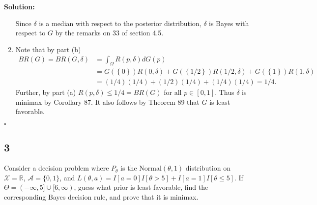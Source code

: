 \documentclass[12pt]{article}
\newcounter{ProofCounter}
\newenvironment{Solution}{\stepcounter{ProofCounter}\textbf{Solution:}}{\hfill$\square$}
\begin{document}
\begin{Solution}
\begin{enumerate}[label=(\alph*), leftmargin=*]
      Since $\delta$ is a median with respect to the posterior distribution, $\delta$ is Bayes with respect to $G$ by the remarks on 33 of section
      4.5.


    \item Note that by part (b)
      \begin{align*}
        BR(G) = BR(G, \delta)& = \int_{\Omega}R(p, \delta)dG(p) \\
        & = G(\left\{ 0 \right\}) R(0,\delta) + G(\left\{ 1/2 \right\})R(1/2, \delta) + G(\left\{ 1 \right\})R(1,\delta) \\
        & = (1/4)(1/4) + (1/2)(1/4) + (1/4)(1/4) = 1/4.
      \end{align*}
      Further, by part (a) $R(p, \delta) \leq 1/4 = BR(G)$ for all $p \in [0,1]$. Thus $\delta$ is minimax by Corollary 87. It also follows by Theorem
      89 that $G$ is least favorable.
  \end{enumerate}
\end{Solution}

\newpage
\subsection*{3}
\begin{tcolorbox}
  Consider a decision problem where $P_\theta$ is the Normal$(\theta,1)$ distribution on $\mathcal{X}=\mathbb{R}$, $\mathcal{A}=\{0,1\}$, and $L(\theta,a)=I[a=0]I[\theta>5] + I[a=1]I[\theta \leq 5]$.  If $\Theta= (-\infty,5] \cup [6,\infty)$, guess what prior is least favorable, find the corresponding Bayes decision rule, and prove that it is minimax.
\end{tcolorbox}
\end{document}
